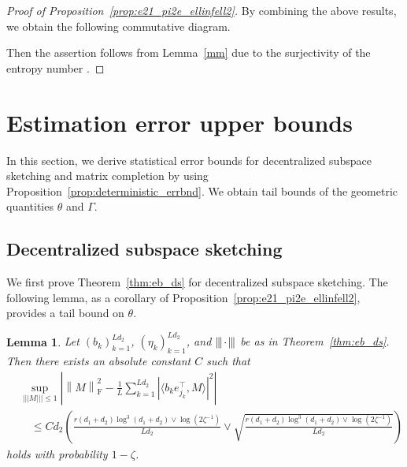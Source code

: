 \documentclass[11pt]{article}
\newtheorem{lemma}{Lemma}[section]
\newcommand{\xspace}{\hbox{\kern-2.5pt}}
\newcommand\tnorm[1]{\left\vert\xspace\left\vert\xspace\left\vert\mskip2mu
#1\mskip2mu \right\vert\xspace\right\vert\xspace\right\vert}
\newcommand{\norm}[1]{\left \|#1 \right \|}
\begin{document}
\begin{proof}[Proof of Proposition~\ref{prop:e21_pi2e_ellinfell2}]
By combining the above results, we obtain the following commutative diagram. 
\begin{center}
\end{center}
Then the assertion follows from Lemma~\ref{mm} due to the surjectivity of the entropy number \cite[p. 12]{carl2008entropy}. 
\end{proof}

\section{Estimation error upper bounds}
\label{sec:err_bnd}

In this section, we derive statistical error bounds for decentralized subspace sketching and matrix completion by using Proposition~\ref{prop:deterministic_errbnd}. 
We obtain tail bounds of the geometric quantities $\theta$ and $\Gamma$. 

\subsection{Decentralized subspace sketching}
\label{sec:DS}

We first prove Theorem~\ref{thm:eb_ds} for decentralized subspace sketching.
The following lemma, as a corollary of Proposition~\ref{prop:e21_pi2e_ellinfell2}, provides a tail bound on $\theta$. 
\begin{lemma}
\label{lemma:rip_dc}
Let $(b_k)_{k=1}^{Ld_2}$, $(\eta_k)_{k=1}^{Ld_2}$, and $\tnorm{\cdot}$ be as in Theorem~\ref{thm:eb_ds}.
Then there exists an absolute constant $C$ such that
\begin{align*}
& \sup_{\vert\vert\vert M \vert\vert\vert \leq 1}
\left| \norm{M}_\mathrm{F}^2 - \frac{1}{L} \sum_{k=1}^{Ld_2} |\langle b_k e_{j_k}^\top, M \rangle|^2 \right| \\
& \quad \leq
C d_2 \left( \frac{r(d_1+d_2)\log^3(d_1+d_2) \vee \log(2\zeta^{-1})}{Ld_2} \vee \sqrt{\frac{r(d_1+d_2)\log^3(d_1+d_2) \vee \log(2\zeta^{-1})}{Ld_2}} \right)
\end{align*}
holds with probability $1-\zeta$.
\end{lemma}
\end{document}
